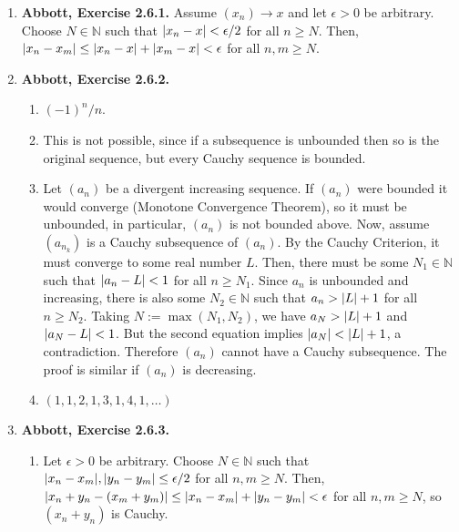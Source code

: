 \documentclass{article}
\DeclarePairedDelimiter\abs{\lvert}{\rvert}
\newcommand{\N}{\mathbb{N}}
\newcommand{\ra}{\rightarrow}
\newcommand{\exc}[2][Abbott]{\item \textbf{#1, Exercise #2.}}
\newcommand{\lep}[1][L]{#1et $\epsilon > 0$ be arbitrary}
\let\oldmax\max
\renewcommand{\max}[1]{\oldmax \left( #1 \right)}
\begin{document}
\begin{enumerate}
    To see that $(a_{n_k}) \ra 0$, \lep[l]. Choose $N \in \N$ such that $N > 1/\epsilon$. Since $s-1/k < a_{n_k} \leq s+1/k$ for every $k \in \N$, then $\abs*{a_{n_k} - s} \leq 1/k$. Letting $k \geq N$, we have $\abs*{a_{n_k}-s} \leq 1/k < \epsilon$, and we are done.

    \exc{2.6.1}
    Assume $(x_n) \ra x$ and \lep[l]. Choose $N \in \N$ such that $\abs*{x_n-x} < \epsilon/2$ for all $n \geq N$. Then, $\abs*{x_n-x_m} \leq \abs*{x_n-x} + \abs*{x_m-x} < \epsilon$ for all $n,m \geq N$.
    
    \exc{2.6.2}
    \begin{enumerate}
        \item $(-1)^n/n$.
        
        \item This is not possible, since if a subsequence is unbounded then so is the original sequence, but every Cauchy sequence is bounded.
        
        \item Let $(a_n)$ be a divergent increasing sequence. If $(a_n)$ were bounded it would converge (Monotone Convergence Theorem), so it must be unbounded, in particular, $(a_n)$ is not bounded above. Now, assume $(a_{n_k})$ is a Cauchy subsequence of $(a_n)$. By the Cauchy Criterion, it must converge to some real number $L$. Then, there must be some $N_1 \in \N$ such that $\abs*{a_n - L} < 1$ for all $n \geq N_1$. Since $a_n$ is unbounded and increasing, there is also some $N_2 \in \N$ such that $a_n > \abs*{L}+1$ for all $n \geq N_2$. Taking $N := \max{N_1, N_2}$, we have $a_N > \abs*{L} + 1$ and $\abs*{a_N-L} < 1$. But the second equation implies $\abs*{a_N} < \abs*{L} + 1$, a contradiction. Therefore $(a_n)$ cannot have a Cauchy subsequence. The proof is similar if $(a_n)$ is decreasing.
        
        \item $(1, 1, 2, 1, 3, 1, 4, 1, \dots)$
    \end{enumerate}
    
    \exc{2.6.3}
    \begin{enumerate}
        \item \lep. Choose $N \in \N$ such that $\abs*{x_n-x_m}, \abs*{y_n-y_m} \leq \epsilon/2$ for all $n,m \geq N$. Then, $\abs*{x_n+y_n-(x_m+y_m)} \leq \abs*{x_n-x_m} + \abs*{y_n-y_m} < \epsilon$ for all $n,m \geq N$, so $(x_n + y_n)$ is Cauchy.
        

\end{enumerate}
\end{enumerate}
\end{document}
